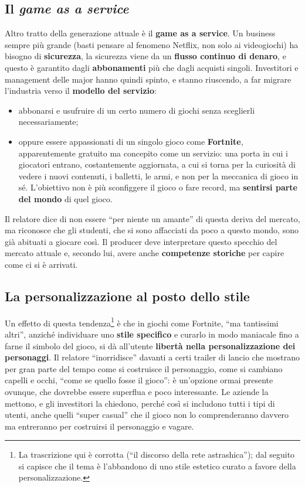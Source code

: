 \subsection{Il \emph{game as a service}}

Altro tratto della generazione attuale è il \textbf{game as a service}. Un
business sempre più grande (basti pensare al fenomeno Netflix, non solo ai
videogiochi) ha bisogno di \textbf{sicurezza}, la sicurezza viene da un
\textbf{flusso continuo di denaro}, e questo è garantito dagli
\textbf{abbonamenti} più che dagli acquisti singoli. Investitori e management
delle major hanno quindi spinto, e stanno riuscendo, a far migrare l'industria
verso il \textbf{modello del servizio}:
\begin{itemize}
  \item abbonarsi e usufruire di un certo numero di giochi senza sceglierli
        necessariamente;
  \item oppure essere appassionati di un singolo gioco come
        \textbf{Fortnite}, apparentemente gratuito ma concepito come un
        servizio: una porta in cui i giocatori entrano, costantemente
        aggiornata, a cui si torna per la curiosità di vedere i nuovi
        contenuti, i balletti, le armi, e non per la meccanica di gioco in sé.
        L'obiettivo non è più sconfiggere il gioco o fare record, ma
        \textbf{sentirsi parte del mondo} di quel gioco.
\end{itemize}
Il relatore dice di non essere ``per niente un amante'' di questa deriva del
mercato, ma riconosce che gli studenti, che si sono affacciati da poco a questo
mondo, sono già abituati a giocare così. Il producer deve interpretare questo
specchio del mercato attuale e, secondo lui, avere anche \textbf{competenze
storiche} per capire come ci si è arrivati.

\subsection{La personalizzazione al posto dello stile}

Un effetto di questa tendenza\footnote{La trascrizione qui è corrotta (``il
discorso della rete astrashica''); dal seguito si capisce che il tema è
l'abbandono di uno stile estetico curato a favore della personalizzazione.} è
che in giochi come Fortnite, ``ma tantissimi altri'', anziché individuare uno
\textbf{stile specifico} e curarlo in modo maniacale fino a farne il simbolo del
gioco, si dà all'utente \textbf{libertà nella personalizzazione dei
personaggi}. Il relatore ``inorridisce'' davanti a certi trailer di lancio che
mostrano per gran parte del tempo come si costruisce il personaggio, come si
cambiano capelli e occhi, ``come se quello fosse il gioco'': è un'opzione ormai
presente ovunque, che dovrebbe essere superflua e poco interessante. Le aziende
la mettono, e gli investitori la chiedono, perché così si includono tutti i
tipi di utenti, anche quelli ``super casual'' che il gioco non lo
comprenderanno davvero ma entreranno per costruirsi il personaggio e vagare.

